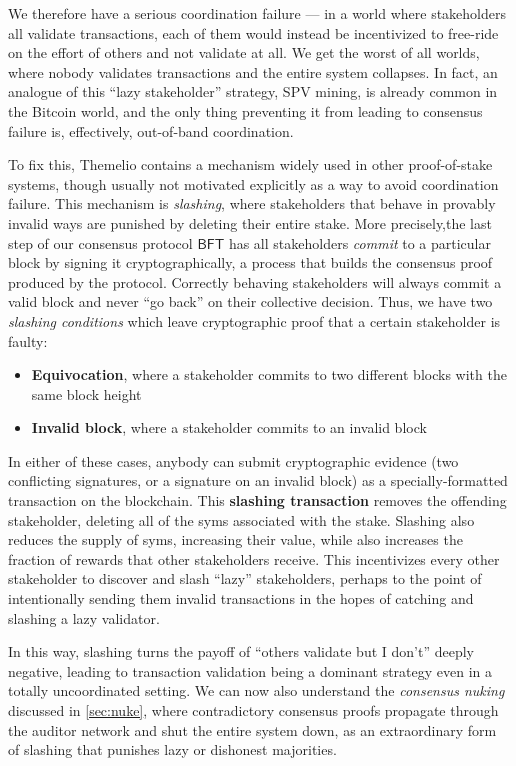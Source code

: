 \documentclass[letterpaper,12pt,oneside]{article}
\begin{document}
We therefore have a serious coordination failure --- in a world where stakeholders all validate transactions, each of them would instead be incentivized to free-ride on the effort of others and not validate at all. We get the worst of all worlds, where nobody validates transactions and the entire system collapses. In fact, an analogue of this ``lazy stakeholder'' strategy, SPV mining, is already common in the Bitcoin world, and the only thing preventing it from leading to consensus failure is, effectively, out-of-band coordination.

To fix this, Themelio contains a mechanism widely used in other proof-of-stake systems, though usually not motivated explicitly as a way to avoid coordination failure. This mechanism is \emph{slashing}, where stakeholders that behave in provably invalid ways are punished by deleting their entire stake. More precisely,the last step of our consensus protocol $\mathsf{BFT}$ has all stakeholders \emph{commit} to a particular block by signing it cryptographically, a process that builds the consensus proof produced by the protocol. Correctly behaving stakeholders will always commit a valid block and never ``go back'' on their collective decision. Thus, we have two \emph{slashing conditions} which leave cryptographic proof that a certain stakeholder is faulty:

\begin{itemize}
    \item \textbf{Equivocation}, where a stakeholder commits to two different blocks with the same block height
    \item \textbf{Invalid block}, where a stakeholder commits to an invalid block
\end{itemize}

In either of these cases, anybody can submit cryptographic evidence (two conflicting signatures, or a signature on an invalid block) as a specially-formatted transaction on the blockchain. This \textbf{slashing transaction} removes the offending stakeholder, deleting all of the syms associated with the stake. Slashing also reduces the supply of syms, increasing their value, while also increases the fraction of rewards that other stakeholders receive. This incentivizes every other stakeholder to discover and slash ``lazy'' stakeholders, perhaps to the point of intentionally sending them invalid transactions in the hopes of catching and slashing a lazy validator.

In this way, slashing turns the payoff of ``others validate but I don't'' deeply negative, leading to transaction validation being a dominant strategy even in a totally uncoordinated setting. We can now also understand the \emph{consensus nuking} discussed in \ref{sec:nuke}, where contradictory consensus proofs propagate through the auditor network and shut the entire system down, as an extraordinary form of slashing that punishes lazy or dishonest majorities.
\end{document}
